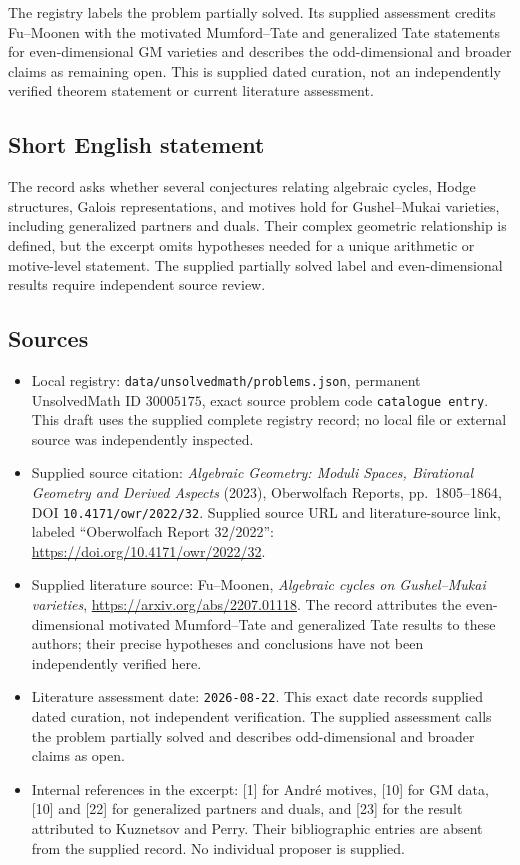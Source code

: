\documentclass[11pt]{article}
\begin{document}
The registry labels the problem partially solved. Its supplied assessment credits Fu--Moonen with the motivated Mumford--Tate and generalized Tate statements for even-dimensional GM varieties and describes the odd-dimensional and broader claims as remaining open. This is supplied dated curation, not an independently verified theorem statement or current literature assessment.
\subsection{Short English statement}
The record asks whether several conjectures relating algebraic cycles, Hodge structures, Galois representations, and motives hold for Gushel--Mukai varieties, including generalized partners and duals. Their complex geometric relationship is defined, but the excerpt omits hypotheses needed for a unique arithmetic or motive-level statement. The supplied partially solved label and even-dimensional results require independent source review.
\subsection{Sources}
\begin{itemize}
\item Local registry: \texttt{data/unsolvedmath/problems.json}, permanent UnsolvedMath ID \(30005175\), exact source problem code \texttt{catalogue entry}. This draft uses the supplied complete registry record; no local file or external source was independently inspected.
\item Supplied source citation: \emph{Algebraic Geometry: Moduli Spaces, Birational Geometry and Derived Aspects} (2023), Oberwolfach Reports, pp.~1805--1864, DOI \texttt{10.4171/owr/2022/32}. Supplied source URL and literature-source link, labeled ``Oberwolfach Report 32/2022'': \url{https://doi.org/10.4171/owr/2022/32}.
\item Supplied literature source: Fu--Moonen, \emph{Algebraic cycles on Gushel--Mukai varieties}, \url{https://arxiv.org/abs/2207.01118}. The record attributes the even-dimensional motivated Mumford--Tate and generalized Tate results to these authors; their precise hypotheses and conclusions have not been independently verified here.
\item Literature assessment date: \texttt{2026-08-22}. This exact date records supplied dated curation, not independent verification. The supplied assessment calls the problem partially solved and describes odd-dimensional and broader claims as open.
\item Internal references in the excerpt: [1] for Andr\'e motives, [10] for GM data, [10] and [22] for generalized partners and duals, and [23] for the result attributed to Kuznetsov and Perry. Their bibliographic entries are absent from the supplied record. No individual proposer is supplied.
\end{itemize}
\end{document}
